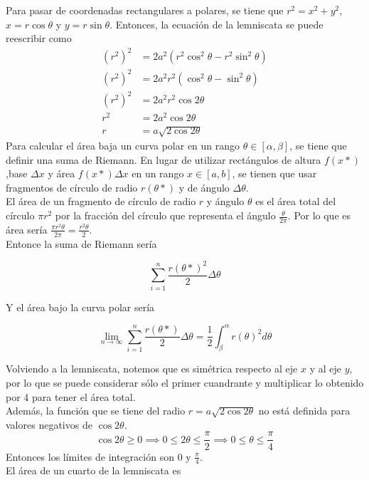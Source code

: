 \documentclass{article}
\begin{document}
\begin{enumerate}
{            \color{azul}
          	Para pasar de coordenadas rectangulares a polares, se tiene que
						$r^2 = x^2+y^2$, $x = r\cos \theta$ y  $y = r\sin \theta$.
						Entonces, la ecuación de la lemniscata se puede reescribir como
						\begin{align*}
							(r^2)^2 &= 2a^2(r^2 \cos^2 \theta - r^2 \sin^2 \theta)\\
							(r^2)^2 &= 2a^2r^2(\cos^2 \theta - \sin^2 \theta)\\
							(r^2)^2 &= 2a^2r^2\cos2\theta\\
							r^2 &= 2a^2\cos2\theta\\
							r &= a\sqrt{2\cos2\theta}
						\end{align*}
						Para calcular el área baja un curva polar en un rango
						$\theta \in[\alpha, \beta]$, se tiene que definir una
						suma de Riemann. En lugar de utilizar rectángulos de altura $f(x*)$
						,base $\Delta x$ y área $f(x*)\Delta x$ en un rango $x\in[a, b]$,
						se tienen que usar fragmentos de círculo de radio $r(\theta *)$
						y de ángulo $\Delta \theta$.\\
						El área de un fragmento de círculo de radio $r$ y ángulo $\theta$
						es el área total del círculo $\pi r^2$ por la fracción del círculo
						que representa el ángulo $\frac{\theta}{2\pi}$. Por lo que es área
						sería $\frac{\pi r ^2\theta}{2\pi} = \frac{r^2\theta}{2}$.\\
						Entonce la suma de Riemann sería

						\[\sum_{i = 1}^n {\frac{r(\theta *)^2}{2}}\Delta \theta\]

						Y el área bajo la curva polar sería

						\[
							\lim_{n \to \infty}\sum_{i = 1}^n {\frac{r(\theta *)}{2}}\Delta \theta
							= \frac{1}{2}\int_\beta^\alpha {r(\theta)^2}d\theta
						\]

						Volviendo a la lemniscata, notemos que es simétrica respecto al eje
						$x$ y al eje $y$, por lo que se puede considerar sólo el primer
						cuandrante y multiplicar lo obtenido por 4 para tener el área total.\\
						Además, la función que se tiene del radio $r = a\sqrt{2\cos2\theta}$
						no está definida para valores negativos de $\cos2\theta$.
						\[
							\cos2\theta \geq 0 \implies 0 \leq 2\theta \leq \frac{\pi}{2}
							\implies 0 \leq \theta \leq \frac{\pi}{4}
						\]
						Entonces los límites de integración son 0 y $\frac{\pi}{4}$.\\
						El área de un cuarto de la lemniscata es

}
\end{enumerate}
\end{document}
